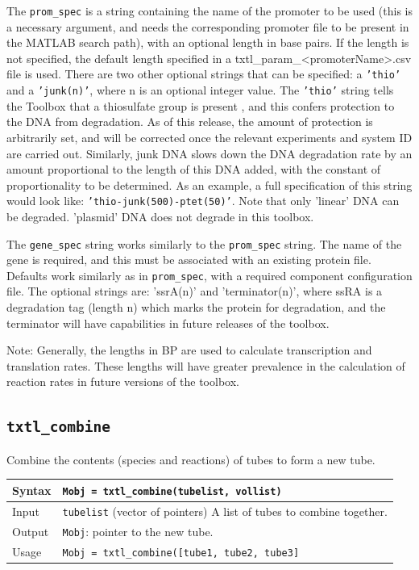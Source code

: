 \documentclass[english]{report}
\begin{document}
			\vspace{1\baselineskip}
						
The \texttt{prom\_spec} is a string containing the name of the promoter to be used (this is a necessary argument, and needs the corresponding promoter file to be present in the MATLAB search path), with an optional length in base pairs. If the length is not specified, the default length specified in a \textsf{txtl\_param\_<promoterName>.csv} file is used. There are two other optional strings that can be specified: a \texttt{'thio'} and a \texttt{'junk(n)'}, where n is an optional integer value. The \texttt{'thio'} string tells the Toolbox that a thiosulfate group is present , and this confers protection to the DNA from degradation. As of this release, the amount of protection is arbitrarily set, and will be corrected once the relevant experiments and system ID are carried out. Similarly, junk DNA slows down the DNA degradation rate by an amount proportional to the length of this DNA added, with the constant of proportionality to be determined. As an example, a full specification of this string would look like: \texttt{'thio-junk(500)-ptet(50)'}. Note that only 'linear' DNA can be degraded. 'plasmid' DNA does not degrade in this toolbox. 

The \texttt{gene\_spec} string works similarly to the \texttt{prom\_spec} string. The name of the gene is required, and this must be associated with an existing protein file. Defaults work similarly as in \texttt{prom\_spec}, with a required component configuration file. The optional strings are: 'ssrA(n)' and 'terminator(n)', where ssRA is a degradation tag (length n) which marks the protein for degradation, and the terminator will have capabilities in future releases of the toolbox. 

Note: Generally, the lengths in BP are used to calculate transcription and translation rates. These lengths will have greater prevalence in the calculation of reaction rates in future versions of the toolbox. 

		\subsection*{\texttt{txtl\_combine}}
				Combine the contents (species and reactions) of tubes to form a new tube. \\	
			
			\begin{tabular}{p{2cm}|p{13cm}}
			Syntax & \texttt{Mobj = txtl\_combine(tubelist, vollist)}\\ \hline
			Input & \texttt{tubelist} (vector of pointers) A list of tubes to combine together. \\ \hline
			Output & \texttt{Mobj}: pointer to the new tube.\\ \hline
			Usage & \texttt{Mobj = txtl\_combine([tube1, tube2, tube3]}\\
			\end{tabular}
				
\end{document}
